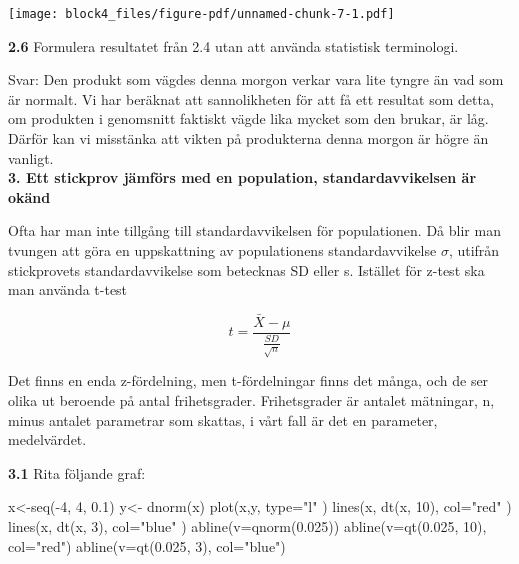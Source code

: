 \documentclass[
  letterpaper,
  DIV=11,
  numbers=noendperiod]{scrartcl}
\newenvironment{Shaded}{\begin{snugshade}}{\end{snugshade}}
\newcommand{\AttributeTok}[1]{\textcolor[rgb]{0.40,0.45,0.13}{#1}}
\newcommand{\DecValTok}[1]{\textcolor[rgb]{0.68,0.00,0.00}{#1}}
\newcommand{\FloatTok}[1]{\textcolor[rgb]{0.68,0.00,0.00}{#1}}
\newcommand{\FunctionTok}[1]{\textcolor[rgb]{0.28,0.35,0.67}{#1}}
\newcommand{\NormalTok}[1]{\textcolor[rgb]{0.00,0.23,0.31}{#1}}
\newcommand{\OtherTok}[1]{\textcolor[rgb]{0.00,0.23,0.31}{#1}}
\newcommand{\SpecialCharTok}[1]{\textcolor[rgb]{0.37,0.37,0.37}{#1}}
\newcommand{\StringTok}[1]{\textcolor[rgb]{0.13,0.47,0.30}{#1}}
\begin{document}
\texttt{[image: block4\_files/figure-pdf/unnamed-chunk-7-1.pdf]}

\textbf{2.6} Formulera resultatet från 2.4 utan att använda statistisk
terminologi.

\hfill\break
Svar: Den produkt som vägdes denna morgon verkar vara lite tyngre än vad
som är normalt. Vi har beräknat att sannolikheten för att få ett
resultat som detta, om produkten i genomsnitt faktiskt vägde lika mycket
som den brukar, är låg. Därför kan vi misstänka att vikten på
produkterna denna morgon är högre än vanligt.\\

\textbf{3. Ett stickprov jämförs med en population, standardavvikelsen
är okänd}

Ofta har man inte tillgång till standardavvikelsen för populationen. Då
blir man tvungen att göra en uppskattning av populationens
standardavvikelse \(\sigma\), utifrån stickprovets standardavvikelse som
betecknas SD eller s. Istället för z-test ska man använda t-test

\[
t = \frac{\bar{X} - \mu}{\frac{SD}{\sqrt{n}}}
\]

Det finns en enda z-fördelning, men t-fördelningar finns det många, och
de ser olika ut beroende på antal frihetsgrader. Frihetsgrader är
antalet mätningar, n, minus antalet parametrar som skattas, i vårt fall
är det en parameter, medelvärdet.

\textbf{3.1} Rita följande graf:

\begin{Shaded}
\begin{Highlighting}[]
\NormalTok{x}\OtherTok{\textless{}{-}}\FunctionTok{seq}\NormalTok{(}\SpecialCharTok{{-}}\DecValTok{4}\NormalTok{, }\DecValTok{4}\NormalTok{, }\FloatTok{0.1}\NormalTok{)}
\NormalTok{y}\OtherTok{\textless{}{-}} \FunctionTok{dnorm}\NormalTok{(x)}
\FunctionTok{plot}\NormalTok{(x,y, }\AttributeTok{type=}\StringTok{"l"}\NormalTok{ )}
\FunctionTok{lines}\NormalTok{(x, }\FunctionTok{dt}\NormalTok{(x, }\DecValTok{10}\NormalTok{), }\AttributeTok{col=}\StringTok{"red"}\NormalTok{ )}
\FunctionTok{lines}\NormalTok{(x, }\FunctionTok{dt}\NormalTok{(x, }\DecValTok{3}\NormalTok{), }\AttributeTok{col=}\StringTok{"blue"}\NormalTok{ )}
\FunctionTok{abline}\NormalTok{(}\AttributeTok{v=}\FunctionTok{qnorm}\NormalTok{(}\FloatTok{0.025}\NormalTok{))}
\FunctionTok{abline}\NormalTok{(}\AttributeTok{v=}\FunctionTok{qt}\NormalTok{(}\FloatTok{0.025}\NormalTok{, }\DecValTok{10}\NormalTok{), }\AttributeTok{col=}\StringTok{"red"}\NormalTok{)}
\FunctionTok{abline}\NormalTok{(}\AttributeTok{v=}\FunctionTok{qt}\NormalTok{(}\FloatTok{0.025}\NormalTok{, }\DecValTok{3}\NormalTok{), }\AttributeTok{col=}\StringTok{"blue"}\NormalTok{)}
\end{Highlighting}
\end{Shaded}
\end{document}
